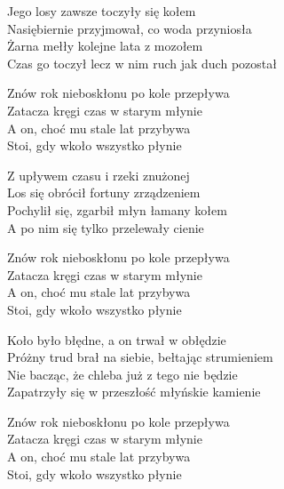 \begin{text}
Jego losy zawsze toczyły się kołem\\
Nasiębiernie przyjmował, co woda przyniosła\\
Żarna mełły kolejne lata z mozołem\\
Czas go toczył lecz w nim ruch jak duch pozostał

Znów rok nieboskłonu po kole przepływa\\
Zatacza kręgi czas w starym młynie\\
A on, choć mu stale lat przybywa\\
Stoi, gdy wkoło wszystko płynie

Z upływem czasu i rzeki znużonej\\
Los się obrócił fortuny zrządzeniem\\
Pochylił się, zgarbił młyn łamany kołem\\
A po nim się tylko przelewały cienie

Znów rok nieboskłonu po kole przepływa\\
Zatacza kręgi czas w starym młynie\\
A on, choć mu stale lat przybywa\\
Stoi, gdy wkoło wszystko płynie

Koło było błędne, a on trwał w obłędzie\\
Próżny trud brał na siebie, bełtając strumieniem\\
Nie bacząc, że chleba już z tego nie będzie\\
Zapatrzyły się w przeszłość młyńskie kamienie

Znów rok nieboskłonu po kole przepływa\\
Zatacza kręgi czas w starym młynie\\
A on, choć mu stale lat przybywa\\
Stoi, gdy wkoło wszystko płynie
\end{text}